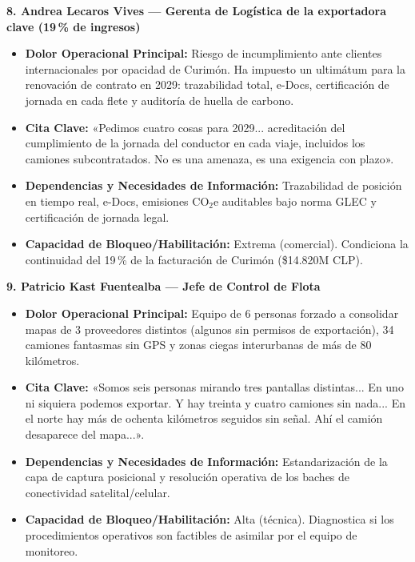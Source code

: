 \textbf{8. Andrea Lecaros Vives --- Gerenta de Logística de la exportadora clave (19\,\% de ingresos)}
\begin{itemize}
    \item \textbf{Dolor Operacional Principal:} Riesgo de incumplimiento ante clientes internacionales por opacidad de Curimón. Ha impuesto un ultimátum para la renovación de contrato en 2029: trazabilidad total, e-Docs, certificación de jornada en cada flete y auditoría de huella de carbono.
    \item \textbf{Cita Clave:} «Pedimos cuatro cosas para 2029... acreditación del cumplimiento de la jornada del conductor en cada viaje, incluidos los camiones subcontratados. No es una amenaza, es una exigencia con plazo».
    \item \textbf{Dependencias y Necesidades de Información:} Trazabilidad de posición en tiempo real, e-Docs, emisiones CO$_2$e auditables bajo norma GLEC y certificación de jornada legal.
    \item \textbf{Capacidad de Bloqueo/Habilitación:} Extrema (comercial). Condiciona la continuidad del 19\,\% de la facturación de Curimón (\$14.820M CLP).
\end{itemize}

\textbf{9. Patricio Kast Fuentealba --- Jefe de Control de Flota}
\begin{itemize}
    \item \textbf{Dolor Operacional Principal:} Equipo de 6 personas forzado a consolidar mapas de 3 proveedores distintos (algunos sin permisos de exportación), 34 camiones fantasmas sin GPS y zonas ciegas interurbanas de más de 80 kilómetros.
    \item \textbf{Cita Clave:} «Somos seis personas mirando tres pantallas distintas... En uno ni siquiera podemos exportar. Y hay treinta y cuatro camiones sin nada... En el norte hay más de ochenta kilómetros seguidos sin señal. Ahí el camión desaparece del mapa...».
    \item \textbf{Dependencias y Necesidades de Información:} Estandarización de la capa de captura posicional y resolución operativa de los baches de conectividad satelital/celular.
    \item \textbf{Capacidad de Bloqueo/Habilitación:} Alta (técnica). Diagnostica si los procedimientos operativos son factibles de asimilar por el equipo de monitoreo.
\end{itemize}

